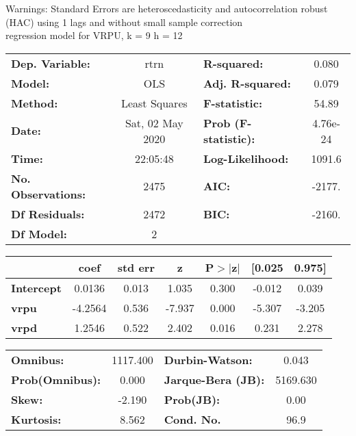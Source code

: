 Warnings: \newline
 [1] Standard Errors are heteroscedasticity and autocorrelation robust (HAC) using 1 lags and without small sample correction\\ 

regression model for VRPU, k = 9 h = 12\begin{center}
\begin{tabular}{lclc}
\toprule
\textbf{Dep. Variable:}    &       rtrn       & \textbf{  R-squared:         } &     0.080   \\
\textbf{Model:}            &       OLS        & \textbf{  Adj. R-squared:    } &     0.079   \\
\textbf{Method:}           &  Least Squares   & \textbf{  F-statistic:       } &     54.89   \\
\textbf{Date:}             & Sat, 02 May 2020 & \textbf{  Prob (F-statistic):} &  4.76e-24   \\
\textbf{Time:}             &     22:05:48     & \textbf{  Log-Likelihood:    } &    1091.6   \\
\textbf{No. Observations:} &        2475      & \textbf{  AIC:               } &    -2177.   \\
\textbf{Df Residuals:}     &        2472      & \textbf{  BIC:               } &    -2160.   \\
\textbf{Df Model:}         &           2      & \textbf{                     } &             \\
\bottomrule
\end{tabular}
\begin{tabular}{lcccccc}
                   & \textbf{coef} & \textbf{std err} & \textbf{z} & \textbf{P$> |$z$|$} & \textbf{[0.025} & \textbf{0.975]}  \\
\midrule
\textbf{Intercept} &       0.0136  &        0.013     &     1.035  &         0.300        &       -0.012    &        0.039     \\
\textbf{vrpu}      &      -4.2564  &        0.536     &    -7.937  &         0.000        &       -5.307    &       -3.205     \\
\textbf{vrpd}      &       1.2546  &        0.522     &     2.402  &         0.016        &        0.231    &        2.278     \\
\bottomrule
\end{tabular}
\begin{tabular}{lclc}
\textbf{Omnibus:}       & 1117.400 & \textbf{  Durbin-Watson:     } &    0.043  \\
\textbf{Prob(Omnibus):} &   0.000  & \textbf{  Jarque-Bera (JB):  } & 5169.630  \\
\textbf{Skew:}          &  -2.190  & \textbf{  Prob(JB):          } &     0.00  \\
\textbf{Kurtosis:}      &   8.562  & \textbf{  Cond. No.          } &     96.9  \\
\bottomrule
\end{tabular}
\end{center}

